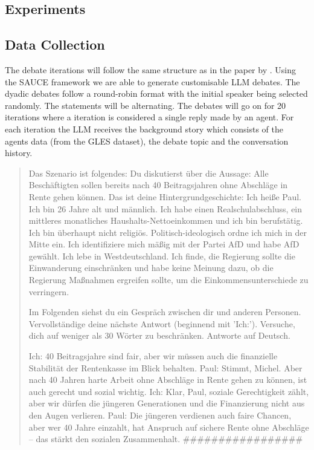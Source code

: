 \documentclass[12pt]{article}
\begin{document}
\begin{multicols}{2}
    


\section{Experiments}

\subsection{Data Collection}
\label{subsec:data_collection}

The debate iterations will follow the same structure as in the paper by . Using the SAUCE framework \cite{neuberger2024sauce} we are able to generate customisable LLM debates.  The dyadic debates follow a round-robin format with the initial speaker being selected randomly. The statements will be alternating. The debates will go on for 20 iterations where a iteration is considered a single reply made by an agent. For each iteration the LLM receives the background story which consists of the agents data (from the GLES dataset), the debate topic and the conversation history. 

\begin{quote}
Das Szenario ist folgendes: Du diskutierst über die Aussage: Alle Beschäftigten sollen bereits nach 40 Beitragsjahren ohne Abschläge in Rente gehen können.
Das ist deine Hintergrundgeschichte: Ich heiße Paul. Ich bin 26 Jahre alt und männlich. Ich habe einen Realschulabschluss, ein mittleres monatliches Haushalts-Nettoeinkommen und ich bin berufstätig. Ich bin überhaupt nicht religiös. Politisch-ideologisch ordne ich mich in der Mitte ein. Ich identifiziere mich mäßig mit der Partei AfD und habe AfD gewählt. Ich lebe in Westdeutschland. Ich finde, die Regierung sollte die Einwanderung einschränken und habe keine Meinung dazu, ob die Regierung Maßnahmen ergreifen sollte, um die Einkommensunterschiede zu verringern.

Im Folgenden siehst du ein Gespräch zwischen dir und anderen Personen. Vervollständige deine nächste Antwort (beginnend mit 'Ich:'). Versuche, dich auf weniger als 30 Wörter zu beschränken. Antworte auf Deutsch.

Ich: 40 Beitragsjahre sind fair, aber wir müssen auch die finanzielle Stabilität der Rentenkasse im Blick behalten.
Paul: Stimmt, Michel. Aber nach 40 Jahren harte Arbeit ohne Abschläge in Rente gehen zu können, ist auch gerecht und sozial wichtig.
Ich: Klar, Paul, soziale Gerechtigkeit zählt, aber wir dürfen die jüngeren Generationen und die Finanzierung nicht aus den Augen verlieren.
Paul: Die jüngeren verdienen auch faire Chancen, aber wer 40 Jahre einzahlt, hat Anspruch auf sichere Rente ohne Abschläge – das stärkt den sozialen Zusammenhalt.
\#\#\#\#\#\#\#\#\#\#\#\#\#\#\#\#\#
\end{quote}




\end{multicols}
\end{document}
